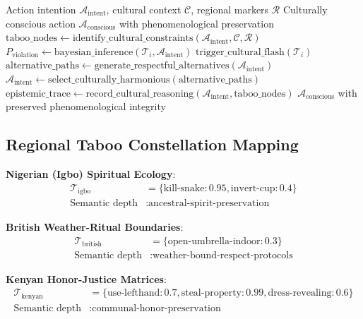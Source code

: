\documentclass[11pt]{article}
\begin{document}
\begin{algorithm}
\caption{Cultural Consciousness Constraint Protocol}
\begin{algorithmic}[1]
\Require Action intention $\mathcal{A}_{\text{intent}}$, cultural context $\mathcal{C}$, regional markers $\mathcal{R}$
\Ensure Culturally conscious action $\mathcal{A}_{\text{conscious}}$ with phenomenological preservation
\State $\text{taboo\_nodes} \leftarrow \text{identify\_cultural\_constraints}(\mathcal{A}_{\text{intent}}, \mathcal{C}, \mathcal{R})$
    \State $P_{\text{violation}} \leftarrow \text{bayesian\_inference}(\mathcal{T}_i, \mathcal{A}_{\text{intent}})$
        \State $\text{trigger\_cultural\_flash}(\mathcal{T}_i)$ 
        \State $\text{alternative\_paths} \leftarrow \text{generate\_respectful\_alternatives}(\mathcal{A}_{\text{intent}})$
        \State $\mathcal{A}_{\text{intent}} \leftarrow \text{select\_culturally\_harmonious}(\text{alternative\_paths})$
    \EndIf
\EndFor
\State $\text{epistemic\_trace} \leftarrow \text{record\_cultural\_reasoning}(\mathcal{A}_{\text{intent}}, \text{taboo\_nodes})$
\Return $\mathcal{A}_{\text{conscious}}$ with preserved phenomenological integrity
\end{algorithmic}
\end{algorithm}

\subsection{Regional Taboo Constellation Mapping}

\textbf{Nigerian (Igbo) Spiritual Ecology}:
\begin{align}
\mathcal{T}_{\text{igbo}} &= \{\text{kill-snake}: 0.95, \text{invert-cup}: 0.4\} \\
\text{Semantic depth} &: \text{ancestral-spirit-preservation}
\end{align}

\textbf{British Weather-Ritual Boundaries}:
\begin{align}
\mathcal{T}_{\text{british}} &= \{\text{open-umbrella-indoor}: 0.3\} \\
\text{Semantic depth} &: \text{weather-bound-respect-protocols}
\end{align}

\textbf{Kenyan Honor-Justice Matrices}:
\begin{align}
\mathcal{T}_{\text{kenyan}} &= \{\text{use-lefthand}: 0.7, \text{steal-property}: 0.99, \text{dress-revealing}: 0.6\} \\
\text{Semantic depth} &: \text{communal-honor-preservation}
\end{align}
\end{document}
